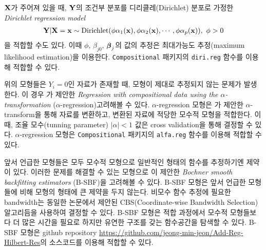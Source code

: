 $\mathbf{X}$가 주어져 있을 때, $\mathbf{Y}$의 조건부 분포를 디리클레(Dirichlet) 분포로 가정한 \textit{Dirichlet regression model}
\begin{equation}\label{eqn:dirireg}
    \begin{gathered}
        \mathbf{Y}|\mathbf{X}=\mathbf{x} \sim \text{Dirichlet}(\phi \alpha_1(\mathbf{x}), \phi \alpha_2(\mathbf{x}),\cdots, \phi \alpha_p(\mathbf{x})),~\phi > 0
    \end{gathered}
\end{equation}
을 적합할 수도 있다. 이때 $\phi$, $\beta_{j0}$, $\boldsymbol{\beta}_j$의 값의 추정은 최대가능도 추정(maximum likelihood estimation)을 이용한다. \texttt{Compositional} 패키지의 \texttt{diri.reg} 함수를 이용해 적합할 수 있다.

위의 모형들은 $Y_i=0$인 자료가 존재할 때, 모형이 제대로 추정되지 않는 문제가 발생한다. 이 경우 \citet{tsagris2015regression}가 제안한 \textit{Regression with compositional data using the $\alpha$-transformation} ($\alpha$-regression)\를 고려해볼 수 있다. $\alpha$-regression 모형은 \citet{tsagris2011data}가 제안한 $\alpha$-transform을 통해 자료를 변환하고, 변환된 자료에 적당한 모수적 모형을 적합한다. 이때, 조율 모수(tunning parameter) $|\alpha|<1$ 값은 cross validation을 통해 결정할 수 있다. $\alpha$-regression 모형은 \texttt{Compositional} 패키지의 \texttt{alfa.reg} 함수를 이용해 적합할 수 있다.

앞서 언급한 모형들은 모두 모수적 모형으로 일반적인 형태의 함수를 추정하기엔 제약이 있다. 이러한 문제를 해결할 수 있는 모형으로 \citet{jeon2018additive}이 제안한 \textit{Bochner smooth backfitting estimators} (B-SBF)을 고려해볼 수 있다. B-SBF 모형은 앞서 언급한 모형들에 비해 모형의 형태에 큰 제약을 두지 않는다. 비모수 함수 추정에 필요한 bandwidth는 동일한 논문에서 제안된 CBS(Coordinate-wise Bandwidth Selection) 알고리듬을 사용하여 결정할 수 있다. B-SBF 모형은 적합 과정에서 모수적 모형들보다 더 많은 시간을 필요로 하지만 유연한 구조를 갖는 함수공간을 탐색할 수 있다. B-SBF 모형은 github repository \url{https://github.com/jeong-min-jeon/Add-Reg-Hilbert-Res}의 소스코드를 이용해 적합할 수 있다.